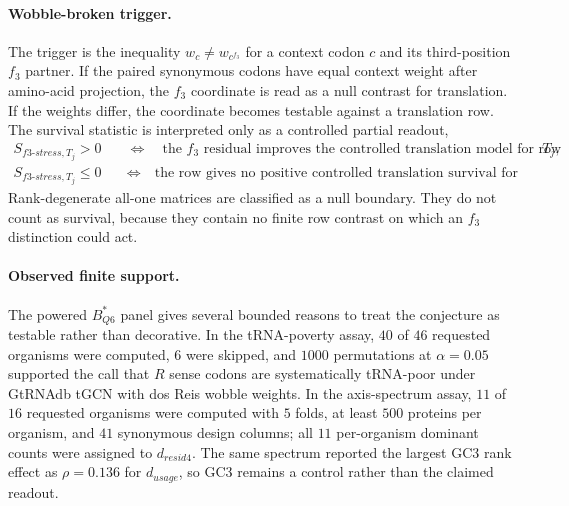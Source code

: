 \paragraph{Wobble-broken trigger.}
The trigger is the inequality $w_c\neq w_{c^{f_3}}$ for a context codon $c$ and its third-position $f_3$ partner.  If the paired synonymous codons have equal context weight after amino-acid projection, the $f_3$ coordinate is read as a null contrast for translation.  If the weights differ, the coordinate becomes testable against a translation row.  The survival statistic is interpreted only as a controlled partial readout,
$$
\begin{aligned}
S_{f3\text{-}stress,T_j}>0
\quad &\Longleftrightarrow\quad
\text{the $f_3$ residual improves the controlled translation model for row }T_j,\\
S_{f3\text{-}stress,T_j}\leq 0
\quad &\Longleftrightarrow\quad
\text{the row gives no positive controlled translation survival for this coordinate.}
\end{aligned}
$$
Rank-degenerate all-one matrices are classified as a null boundary.  They do not count as survival, because they contain no finite row contrast on which an $f_3$ distinction could act.

\paragraph{Observed finite support.}
The powered $B^*_{Q6}$ panel gives several bounded reasons to treat the conjecture as testable rather than decorative.  In the tRNA-poverty assay, $40$ of $46$ requested organisms were computed, $6$ were skipped, and $1000$ permutations at $\alpha=0.05$ supported the call that $R$ sense codons are systematically tRNA-poor under GtRNAdb tGCN with dos Reis wobble weights.  In the axis-spectrum assay, $11$ of $16$ requested organisms were computed with $5$ folds, at least $500$ proteins per organism, and $41$ synonymous design columns; all $11$ per-organism dominant counts were assigned to $d_{resid4}$.  The same spectrum reported the largest GC3 rank effect as $\rho=0.136$ for $d_{usage}$, so GC3 remains a control rather than the claimed readout.

